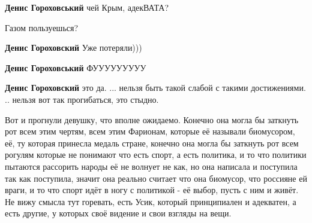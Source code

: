 \begin{itemize}
\begin{itemize}
\textbf{Денис Гороховський} чей Крым, адекВАТА?

 
Газом пользуешься?

 
\textbf{Денис Гороховский} Уже потеряли)))

 
\textbf{Денис Гороховський} ФУУУУУУУУУ

 
\textbf{Денис Гороховский} это да. ... нельзя быть такой слабой с такими достижениями. .. нельзя вот так прогибаться, это стыдно.

\end{itemize}


Вот и прогнули девушку, что вполне ожидаемо. Конечно она могла бы заткнуть рот
всем этим чертям, всем этим Фарионам, которые её называли биомусором, её, ту
которая принесла медаль стране, конечно она могла бы заткнуть рот всем рогулям
которые не понимают что есть спорт, а есть политика, и то что политики пытаются
рассорить народы её не волнует не как, но она написала и поступила так как
поступила, значит она реально считает что она биомусор, что россияне ей враги,
и то что спорт идёт в ногу с политикой - её выбор, пусть с ним и живёт. Не вижу
смысла тут горевать, есть Усик, который принципиален и адекватен, а есть
другие, у которых своё видение и свои взгляды на вещи.


\end{itemize}
